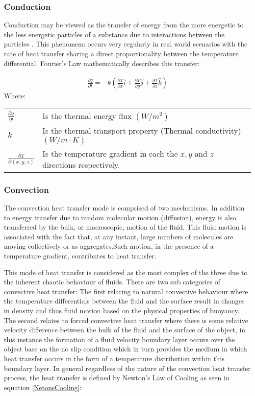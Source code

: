 \documentclass[12pt]{article}
\newcommand{\ts}{\textsuperscript}
\newcommand{\pe}{\vspace{0.3cm}}
\newcommand{\mycite}[1]{\ts{\cite{#1}}}
\begin{document}
\subsubsection{Conduction}
Conduction may be viewed as the transfer of energy from the more energetic to the less
energetic particles of a substance due to interactions between the particles \mycite{bergman2011fundamentals}. This phenomena occurs very regularly in real world scenarios with the rate of heat transfer sharing a direct proportionality between the temperature differential. Fourier's Law mathematically describes this transfer:

\begin{align} \label{condCart}
\frac{\partial q}{\partial t} = -k \left( \frac{\partial T}{\partial x} \hat{i} + \frac{\partial T}{\partial y} \hat{j} + \frac{\partial T}{\partial z} \hat{k} \right)
\end{align}
Where: \\ 
\begin{tabular}{l | l}
	$\frac{\partial q}{\partial t}$ & Is the thermal energy flux $(W/m^2)$ \\ 
	$k$ & Is the thermal transport property (Thermal conductivity) $(W/m \cdot K)$ \\ 
	$\frac{\partial T}{\partial(x,y,z)}$ & Is the temperature gradient in each the $x,y$ and $z$ directions respectively. 
\end{tabular}


\subsubsection{Convection}
The convection heat transfer mode is comprised of two mechanisms. In addition to energy
transfer due to random molecular motion (diffusion), energy is also transferred by the bulk, or macroscopic, motion of the fluid. This fluid motion is associated with the fact that, at any instant, large numbers of molecules are moving collectively or as aggregates.Such motion, in the presence of a temperature gradient, contributes to heat transfer\mycite{bergman2011fundamentals}.  
\pe  

This mode of heat transfer is considered as the most complex of the three due to the inherent chaotic behaviour of fluids. There are two sub categories of convective heat transfer: The first relating to natural convective behaviour where the temperature differentials between the fluid and the surface result in changes in density and thus fluid motion based on the physical properties of buoyancy. The second relates to forced convective heat transfer where there is some relative velocity difference between the bulk of the fluid and the surface of the object, in this instance the formation of a fluid velocity boundary layer occurs over the object base on the no slip condition which in turn provides the medium in which heat transfer occurs in the form of a temperature distribution within this boundary layer. In general regardless of the nature of the convection heat transfer process, the heat transfer is defined by Newton's Law of Cooling as seen in equation \ref{NetonsCooling}: 
\end{document}

